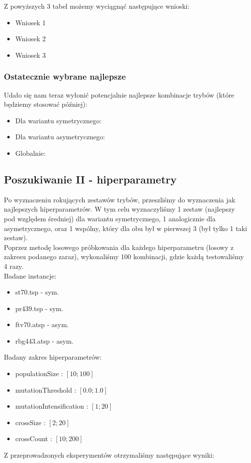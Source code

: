 \documentclass{article}
\begin{document}
Z powyższych 3 tabel możemy wyciągnąć następujące wnioski:
\begin{itemize}
	\item Wniosek 1
	\item Wniosek 2
	\item Wniosek 3
\end{itemize}

\subsubsection{Ostatecznie wybrane najlepsze}
Udało się nam teraz wyłonić potencjalnie najlepsze kombinacje trybów (które będziemy stosować później):
\begin{itemize}
	\item Dla wariantu symetrycznego:
	\item Dla wariantu asymetrycznego:
	\item Globalnie:
\end{itemize}

\newpage
\subsection{Poszukiwanie II - hiperparametry}
Po wyznaczeniu rokujących zestawów trybów, przeszliśmy do wyznaczenia jak najlepszych hiperparametrów. W tym celu wyznaczyliśmy 1 zestaw (najlepszy pod względem średniej) dla wariantu symetrycznego, 1 analogicznie dla asymetrycznego, oraz 1 wspólny, który dla obu był w pierwszej 3 (był tylko 1 taki zestaw).\\
Poprzez metodę losowego próbkowania dla każdego hiperparametru (losowy z zakresu podanego zaraz), wykonaliśmy 100 kombinacji, gdzie każdą testowaliśmy 4 razy.\\
Badane instancje:
\begin{itemize}
	\item st70.tsp - sym.
	\item pr439.tsp - sym.
	\item ftv70.atsp - asym.
	\item rbg443.atsp - asym.
\end{itemize}
Badany zakres hiperparametrów:
\begin{itemize}
	\item populationSize : $[10 ; 100]$
	\item mutationThreshold : $[0.0 ; 1.0]$
	\item mutationIntensification : $[1 ; 20]$
	\item crossSize : $[2 ; 20]$
	\item crossCount : $[10 ; 200]$
\end{itemize}
Z przeprowadzonych eksperymentów otrzymaliśmy następujące wyniki:
\end{document}

